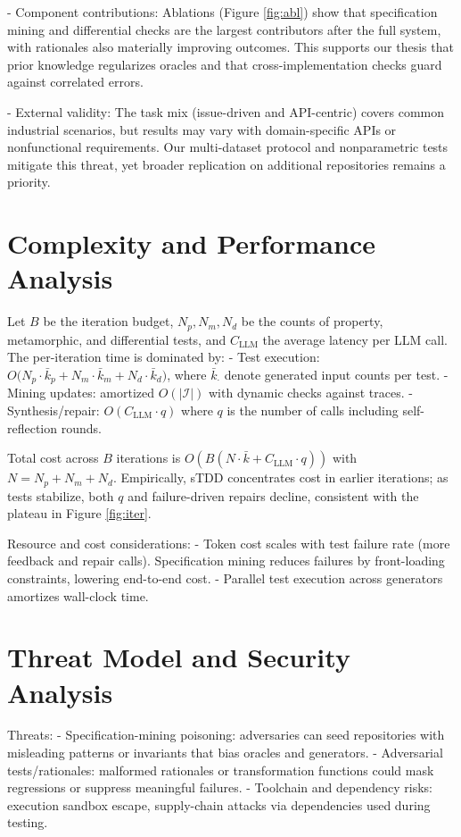 \documentclass[10pt,twocolumn]{article}
\begin{document}
- Component contributions: Ablations (Figure \ref{fig:abl}) show that specification mining and differential checks are the largest contributors after the full system, with rationales also materially improving outcomes. This supports our thesis that prior knowledge regularizes oracles and that cross-implementation checks guard against correlated errors.

- External validity: The task mix (issue-driven and API-centric) covers common industrial scenarios, but results may vary with domain-specific APIs or nonfunctional requirements. Our multi-dataset protocol and nonparametric tests mitigate this threat, yet broader replication on additional repositories remains a priority.

\section{Complexity and Performance Analysis}
Let $B$ be the iteration budget, $N_p,N_m,N_d$ be the counts of property, metamorphic, and differential tests, and $C_\text{LLM}$ the average latency per LLM call. The per-iteration time is dominated by:
- Test execution: $O\big(N_p \cdot \bar{k}_p + N_m \cdot \bar{k}_m + N_d \cdot \bar{k}_d\big)$, where $\bar{k}_\cdot$ denote generated input counts per test.
- Mining updates: amortized $O(|\mathcal{I}|)$ with dynamic checks against traces.
- Synthesis/repair: $O(C_\text{LLM} \cdot q)$ where $q$ is the number of calls including self-reflection rounds.

Total cost across $B$ iterations is $O\!\left(B\left(N \cdot \bar{k} + C_\text{LLM} \cdot q\right)\right)$ with $N=N_p+N_m+N_d$. Empirically, sTDD concentrates cost in earlier iterations; as tests stabilize, both $q$ and failure-driven repairs decline, consistent with the plateau in Figure \ref{fig:iter}.

Resource and cost considerations:
- Token cost scales with test failure rate (more feedback and repair calls). Specification mining reduces failures by front-loading constraints, lowering end-to-end cost.
- Parallel test execution across generators amortizes wall-clock time.

\section{Threat Model and Security Analysis}
Threats:
- Specification-mining poisoning: adversaries can seed repositories with misleading patterns or invariants that bias oracles and generators.
- Adversarial tests/rationales: malformed rationales or transformation functions could mask regressions or suppress meaningful failures.
- Toolchain and dependency risks: execution sandbox escape, supply-chain attacks via dependencies used during testing.
\end{document}
